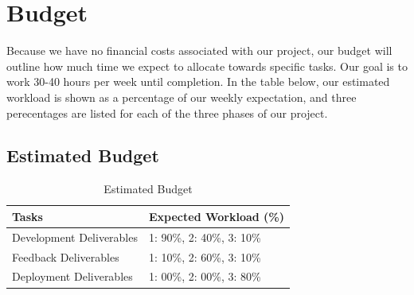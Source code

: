 \documentclass[12pt, letterpaper]{article}
\begin{document}
\section*{Budget}
Because we have no financial costs associated with our project, our budget will outline how much time we expect to allocate towards specific tasks.  Our goal is to work 30-40 hours per week until completion.  In the table below, our estimated workload is shown as a percentage of our weekly expectation, and three perecentages are listed for each of the three phases of our project.  

\subsection*{Estimated Budget}
\begin{table}[h!]
\caption{Estimated Budget}
\centering
\begin{tabular}{|p{6cm}|p{6cm}|}
\hline
\textbf{Tasks} & \textbf{Expected Workload (\%)} \\
\hline
Development Deliverables & 1: 90\%, 2: 40\%, 3: 10\% \\
\hline
Feedback Deliverables & 1: 10\%, 2: 60\%, 3: 10\% \\
\hline
Deployment Deliverables & 1: 00\%, 2: 00\%, 3: 80\%\\
\hline
\end{tabular}
\end{table}
\end{document}
